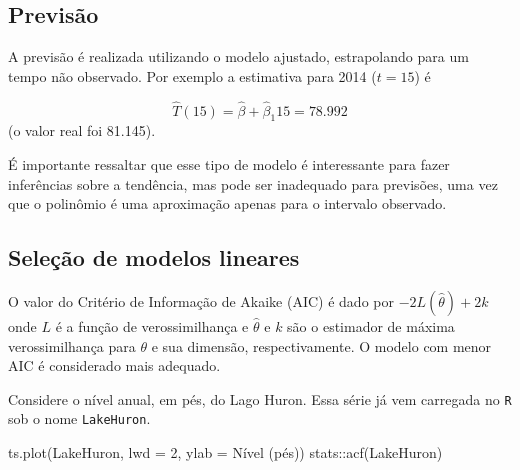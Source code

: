 \documentclass[
  letterpaper,
  DIV=11,
  numbers=noendperiod]{scrartcl}
\newenvironment{Shaded}{\begin{snugshade}}{\end{snugshade}}
\newcommand{\AttributeTok}[1]{\textcolor[rgb]{0.40,0.45,0.13}{#1}}
\newcommand{\DecValTok}[1]{\textcolor[rgb]{0.68,0.00,0.00}{#1}}
\newcommand{\FunctionTok}[1]{\textcolor[rgb]{0.28,0.35,0.67}{#1}}
\newcommand{\NormalTok}[1]{\textcolor[rgb]{0.00,0.23,0.31}{#1}}
\newcommand{\SpecialCharTok}[1]{\textcolor[rgb]{0.37,0.37,0.37}{#1}}
\newcommand{\StringTok}[1]{\textcolor[rgb]{0.13,0.47,0.30}{#1}}
\theoremstyle{definition}
\theoremstyle{definition}
\theoremstyle{plain}
\theoremstyle{plain}
\theoremstyle{remark}
\begin{document}
\subsection{Previsão}\label{previsuxe3o}

A previsão é realizada utilizando o modelo ajustado, estrapolando para
um tempo não observado. Por exemplo a estimativa para 2014 (\(t=15\)) é

\[\hat{T}(15)=\hat{\beta}+\hat{\beta}_1 15 = 78.992\] (o valor real foi
81.145).

É importante ressaltar que esse tipo de modelo é interessante para fazer
inferências sobre a tendência, mas pode ser inadequado para previsões,
uma vez que o polinômio é uma aproximação apenas para o intervalo
observado.

\subsection{Seleção de modelos
lineares}\label{seleuxe7uxe3o-de-modelos-lineares}

O valor do Critério de Informação de Akaike (AIC) é dado por
\(-2L(\hat{\theta})+2k\) onde \(L\) é a função de verossimilhança e
\(\hat{\theta}\) e \(k\) são o estimador de máxima verossimilhança para
\(\theta\) e sua dimensão, respectivamente. O modelo com menor AIC é
considerado mais adequado.

Considere o nível anual, em pés, do Lago Huron. Essa série já vem
carregada no \texttt{R} sob o nome \texttt{LakeHuron}.

\begin{Shaded}
\begin{Highlighting}[]
\FunctionTok{ts.plot}\NormalTok{(LakeHuron, }\AttributeTok{lwd =} \DecValTok{2}\NormalTok{, }\AttributeTok{ylab =} \StringTok{\textquotesingle{}Nível (pés)\textquotesingle{}}\NormalTok{)}
\NormalTok{stats}\SpecialCharTok{::}\FunctionTok{acf}\NormalTok{(LakeHuron)}
\end{Highlighting}
\end{Shaded}
\end{document}
